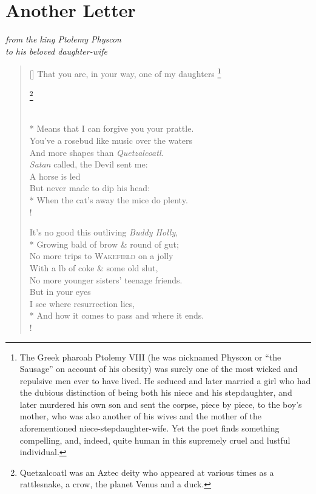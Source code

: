 \documentclass[openany]{amsbook}
\newcommand{\poeticmarginnote}[1]{\marginnote{\footnotesize #1}}
\newcommand\blfootnote[1]{%
    \begingroup
    \renewcommand\thefootnote{}\footnote{#1}%
    \addtocounter{footnote}{-1}%
    \endgroup
}
\begin{document}
\chapter*{Another Letter}

\begin{center}
    \textit{from the king Ptolemy Physcon}\\
    \textit{to his beloved daughter-wife}\poeticmarginnote{TM}
\end{center}

\bigskip

\settowidth{\versewidth}{That you are, in your way, one of my daughters}
\begin{verse}[\versewidth]
    That you are, in your way, one of my daughters\blfootnote{The Greek pharoah Ptolemy VIII (he was nicknamed Physcon or ``the Sausage'' on account of his obesity) was surely one of the most wicked and repulsive men ever to have lived. He seduced and later married a girl who had the dubious distinction of being both his niece and his stepdaughter, and later murdered his own son and sent the corpse, piece by piece, to the boy's mother, who was also another of his wives and the mother of the aforementioned niece-stepdaughter-wife. Yet the poet finds something compelling, and, indeed, quite human in this supremely cruel and lustful individual.}\blfootnote{Quetzalcoatl was an Aztec deity who appeared at various times as a rattlesnake, a crow, the planet Venus and a duck.}\\*
    \vin Means that I can forgive you your prattle.\\
    You've a rosebud like music over the waters\poeticmarginnote{Byron}\\
    \vin And more shapes than \textit{Quetzalcoatl}.\\
    \vin \vin \textit{Satan} called, the Devil sent me:\\
    \vin \vin \vin A horse is led\\
    \vin \vin \vin But never made to dip his head:\\*
    \vin \vin When the cat's away the mice do plenty.\\!

    It's no good this outliving \textit{Buddy Holly},\\*
    \vin Growing bald of brow \& round of gut;\\
    No more trips to \textsc{Wakefield} on a jolly\\
    \vin With  a lb of coke \& some old slut,\\
    \vin \vin No more younger sisters' teenage friends.\\
    \vin \vin \vin But in your eyes\\
    \vin \vin \vin I see where resurrection lies,\\*
    \vin \vin And how it comes to pass and where it ends.\\!


\end{verse}
\end{document}
